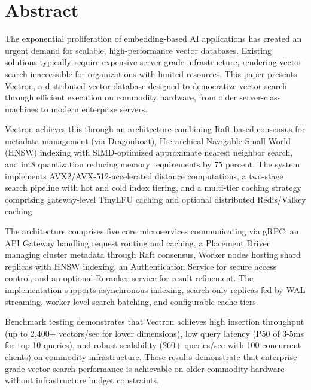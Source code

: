 \chapter*{Abstract}
The exponential proliferation of embedding-based AI applications has created an urgent demand for scalable, high-performance vector databases. Existing solutions typically require expensive server-grade infrastructure, rendering vector search inaccessible for organizations with limited resources. This paper presents Vectron, a distributed vector database designed to democratize vector search through efficient execution on commodity hardware, from older server-class machines to modern enterprise servers.

Vectron achieves this through an architecture combining Raft-based consensus for metadata management (via Dragonboat), Hierarchical Navigable Small World (HNSW) indexing with SIMD-optimized approximate nearest neighbor search, and int8 quantization reducing memory requirements by 75 percent. The system implements AVX2/AVX-512-accelerated distance computations, a two-stage search pipeline with hot and cold index tiering, and a multi-tier caching strategy comprising gateway-level TinyLFU caching and optional distributed Redis/Valkey caching.

The architecture comprises five core microservices communicating via gRPC: an API Gateway handling request routing and caching, a Placement Driver managing cluster metadata through Raft consensus, Worker nodes hosting shard replicas with HNSW indexing, an Authentication Service for secure access control, and an optional Reranker service for result refinement. The implementation supports asynchronous indexing, search-only replicas fed by WAL streaming, worker-level search batching, and configurable cache tiers.

Benchmark testing demonstrates that Vectron achieves high insertion throughput (up to 2,400+ vectors/sec for lower dimensions), low query latency (P50 of 3-5ms for top-10 queries), and robust scalability (260+ queries/sec with 100 concurrent clients) on commodity infrastructure. These results demonstrate that enterprise-grade vector search performance is achievable on older commodity hardware without infrastructure budget constraints.